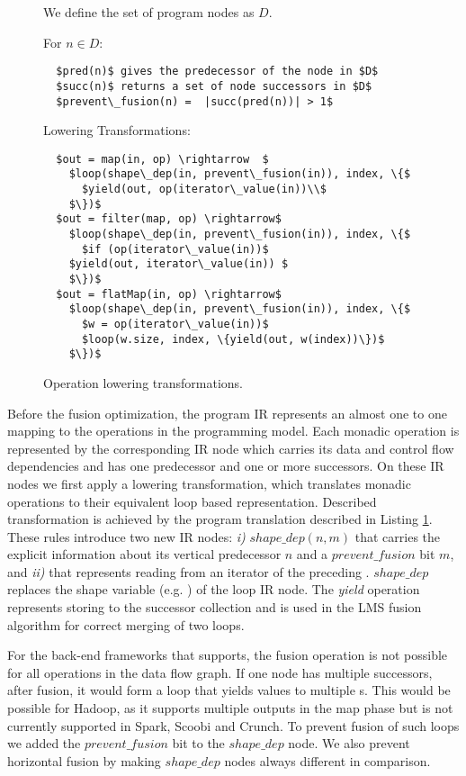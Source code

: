 \begin{figure}[t]
We define the set of program  nodes as $D$.

For $n \in D$:
\begin{lstlisting} 
  $pred(n)$ gives the predecessor of the node in $D$
  $succ(n)$ returns a set of node successors in $D$
  $prevent\_fusion(n) =  |succ(pred(n))| > 1$
\end{lstlisting}

Lowering Transformations:
\begin{lstlisting}
  $out = map(in, op) \rightarrow  $
    $loop(shape\_dep(in, prevent\_fusion(in)), index, \{$
      $yield(out, op(iterator\_value(in))\\$
    $\})$
  $out = filter(map, op) \rightarrow$
    $loop(shape\_dep(in, prevent\_fusion(in)), index, \{$
      $if (op(iterator\_value(in))$
	$yield(out, iterator\_value(in)) $
    $\})$
  $out = flatMap(in, op) \rightarrow$
    $loop(shape\_dep(in, prevent\_fusion(in)), index, \{$
      $w = op(iterator\_value(in))$
      $loop(w.size, index, \{yield(out, w(index))\})$
    $\})$
\end{lstlisting}
\caption{Operation lowering transformations.}
\label{lst:lowering}
\end{figure}

Before the fusion optimization, the program IR represents an almost one to one
mapping to the operations in the programming model. Each monadic operation is
represented by the corresponding IR node which carries its data and control flow
dependencies and has one predecessor and one or more successors. On these IR
nodes we first apply a lowering transformation, which translates monadic
operations to their equivalent loop based representation. Described
transformation is achieved by the program translation described in Listing
\ref{lst:lowering}. These rules introduce two new IR nodes: \emph{i)}
$shape\_dep(n, m)$ that carries the explicit information about its vertical
predecessor $n$ and a $prevent\_fusion$ bit $m$, and \emph{ii)}
 that represents reading from an iterator of the
preceding . $shape\_dep$ replaces the shape variable (e.g.
) of the loop IR node. The \emph{yield} operation represents
storing to the successor collection and is used in the LMS fusion algorithm for
correct merging of two loops.

For the back-end frameworks that \tool supports, the fusion operation is not
possible for all operations in the data flow graph. If one node has multiple
successors, after fusion, it would form a loop that yields values to multiple
s. This would be possible for Hadoop, as it supports multiple
outputs in the map phase but is not currently supported in Spark, Scoobi
and Crunch. To prevent fusion of such loops we added the $prevent\_fusion$ bit
to the $shape\_dep$ node. We also prevent horizontal fusion by making
$shape\_dep$ nodes always different in comparison.


